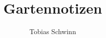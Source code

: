 %
%
%





\author{Tobias Schwinn}
\title{Gartennotizen}
\maketitle

\frontmatter%

%
%

%

\tableofcontents




\mainmatter%



%
%

\backmatter%

%
\printindex
\printbibliography




